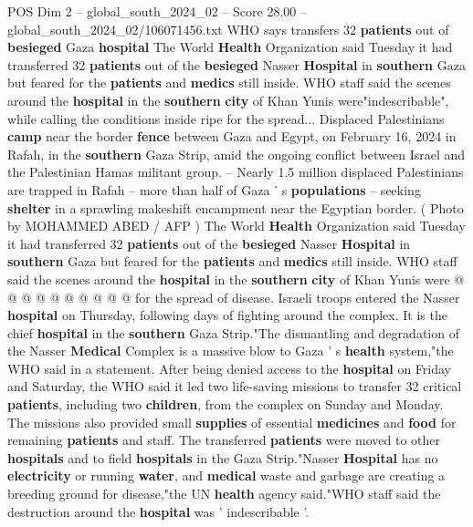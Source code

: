 \begin{textsample}{POS Dim 2 – global\_south\_2024\_02 – Score 28.00 – global\_south\_2024\_02/106071456.txt}  \label{ex:f2_pos_033}
WHO says transfers 32 \textbf{patients} out of \textbf{besieged} Gaza \textbf{hospital} The World \textbf{Health} Organization said Tuesday it had transferred 32 \textbf{patients} out of the \textbf{besieged} Nasser \textbf{Hospital} in \textbf{southern} Gaza but feared for the \textbf{patients} and \textbf{medics} still inside.
WHO staff said the scenes around the \textbf{hospital} in the \textbf{southern} \textbf{city} of Khan Yunis were"indescribable", while calling the conditions inside ripe for the spread...
Displaced Palestinians \textbf{camp} near the border \textbf{fence} between Gaza and Egypt, on February 16, 2024 in Rafah, in the \textbf{southern} Gaza Strip, amid the ongoing conflict between Israel and the Palestinian Hamas militant group. -- Nearly 1.5 million displaced Palestinians are trapped in Rafah -- more than half of Gaza ' s \textbf{populations} -- seeking \textbf{shelter} in a sprawling makeshift encampment near the Egyptian border. ( Photo by MOHAMMED ABED / AFP ) The World \textbf{Health} Organization said Tuesday it had transferred 32 \textbf{patients} out of the \textbf{besieged} Nasser \textbf{Hospital} in \textbf{southern} Gaza but feared for the \textbf{patients} and \textbf{medics} still inside.
WHO staff said the scenes around the \textbf{hospital} in the \textbf{southern} \textbf{city} of Khan Yunis were @ @ @ @ @ @ @ @ @ @ for the spread of disease.
Israeli troops entered the Nasser \textbf{hospital} on Thursday, following days of fighting around the complex.
It is the chief \textbf{hospital} in the \textbf{southern} Gaza Strip."The dismantling and degradation of the Nasser \textbf{Medical} Complex is a massive blow to Gaza ' s \textbf{health} system,"the WHO said in a statement.
After being denied access to the \textbf{hospital} on Friday and Saturday, the WHO said it led two life-saving missions to transfer 32 critical \textbf{patients}, including two \textbf{children}, from the complex on Sunday and Monday.
The missions also provided small \textbf{supplies} of essential \textbf{medicines} and \textbf{food} for remaining \textbf{patients} and staff.
The transferred \textbf{patients} were moved to other \textbf{hospitals} and to field \textbf{hospitals} in the Gaza Strip."Nasser \textbf{Hospital} has no \textbf{electricity} or running \textbf{water}, and \textbf{medical} waste and garbage are creating a breeding ground for disease,"the UN \textbf{health} agency said."WHO staff said the destruction around the \textbf{hospital} was ' indescribable '.

\end{textsample}
